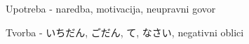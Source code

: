 
\author{Kristijan Čavić}


	\begin{hyou}
	\item Upotreba - naredba, motivacija, neupravni govor
	\item Tvorba - いちだん, ごだん, て, なさい, negativni oblici
	\end{hyou}
